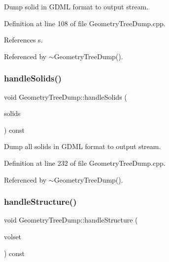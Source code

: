 Dump solid in G\+D\+ML format to output stream. 



Definition at line 108 of file Geometry\+Tree\+Dump.\+cpp.



References s.



Referenced by $\sim$\+Geometry\+Tree\+Dump().

\hypertarget{class_d_d4hep_1_1_geometry_1_1_geometry_tree_dump_a88e70e69ffe3e79eab56a8eeaec8a104}{}\label{class_d_d4hep_1_1_geometry_1_1_geometry_tree_dump_a88e70e69ffe3e79eab56a8eeaec8a104} 
\subsubsection{\texorpdfstring{handle\+Solids()}{handleSolids()}}
{\footnotesize\ttfamily void Geometry\+Tree\+Dump\+::handle\+Solids (\begin{DoxyParamCaption}\item[{const \hyperlink{class_d_d4hep_1_1_geometry_1_1_geo_handler_types_a85d065cdf670a4f9ea9c0c4dee921fce}{Solid\+Set} \&}]{solids }\end{DoxyParamCaption}) const\hspace{0.3cm}{\ttfamily [virtual]}}



Dump all solids in G\+D\+ML format to output stream. 



Definition at line 232 of file Geometry\+Tree\+Dump.\+cpp.



Referenced by $\sim$\+Geometry\+Tree\+Dump().

\hypertarget{class_d_d4hep_1_1_geometry_1_1_geometry_tree_dump_adc31b44fa58ad6aa613550fde32d4c6a}{}\label{class_d_d4hep_1_1_geometry_1_1_geometry_tree_dump_adc31b44fa58ad6aa613550fde32d4c6a} 
\subsubsection{\texorpdfstring{handle\+Structure()}{handleStructure()}}
{\footnotesize\ttfamily void Geometry\+Tree\+Dump\+::handle\+Structure (\begin{DoxyParamCaption}\item[{const \hyperlink{class_d_d4hep_1_1_geometry_1_1_geo_handler_types_a87ea3b22bdfe08f1a4afca3d58fd8ca0}{Volume\+Set} \&}]{volset }\end{DoxyParamCaption}) const\hspace{0.3cm}{\ttfamily [virtual]}}



